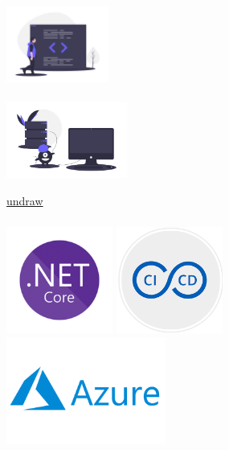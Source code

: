 \documentclass{beamer}
\newcommand{\source}[2]{
	\begin{flushright}
		\hfill {\scriptsize \href{#1}{#2}}	
	\end{flushright}
}
\begin{document}
\begin{frame}
\frametitle{\textbf{}}

    \includegraphics[height=25mm]{code_block.png} \\

    \scalebox{5}{$\Downarrow$} \\

    \includegraphics[height=25mm]{server_down.png}
    \source{https://undraw.co/illustrations}{undraw}

\end{frame}

\begin{frame}
\frametitle{\textbf{}}

    \includegraphics[height=35mm]{aspnet-core.png}
    \includegraphics[height=35mm]{cicd.png} \\
    \includegraphics[height=35mm]{azure.png}

\end{frame}
\end{document}
